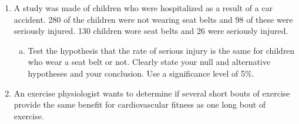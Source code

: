 \documentclass[a4paper,12pt]{article}
\begin{document}
\begin{enumerate}
 \item  A study was made of children who were hospitalized as a result of a car accident. 280 of the children were not wearing seat belts and 98 of these were seriously injured. 130 children wore seat belts and 26 were seriously injured. 
\begin{enumerate}[(a)]
\item Test the hypothesis that the rate of serious injury is the same for children who wear a seat belt or not. Clearly state your null and alternative hypotheses and your conclusion. Use a significance level of 5\%.
\end{enumerate}
\item
An exercise physiologist wants to determine if several short bouts of exercise provide the same benefit for cardiovascular fitness as one long bout of exercise. \\ 



\end{enumerate}
\end{document}
